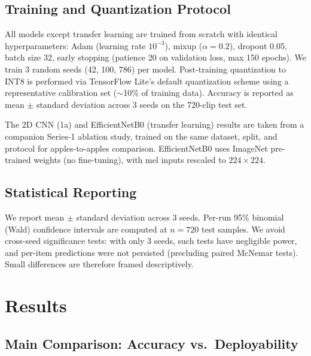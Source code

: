 \documentclass[conference]{IEEEtran}
\begin{document}
\subsection{Training and Quantization Protocol}

All models except transfer learning are trained from scratch with identical hyperparameters: Adam (learning rate $10^{-3}$), mixup ($\alpha=0.2$), dropout 0.05, batch size 32, early stopping (patience 20 on validation loss, max 150 epochs). We train 3 random seeds (42, 100, 786) per model. Post-training quantization to INT8 is performed via TensorFlow Lite's default quantization scheme using a representative calibration set ($\sim$10\% of training data). Accuracy is reported as mean $\pm$ standard deviation across 3 seeds on the 720-clip test set.

The 2D CNN (1a) and EfficientNetB0 (transfer learning) results are taken from a companion Series-1 ablation study, trained on the same dataset, split, and protocol for apples-to-apples comparison. EfficientNetB0 uses ImageNet pre-trained weights (no fine-tuning), with mel inputs rescaled to $224\times224$.

\subsection{Statistical Reporting}

We report mean $\pm$ standard deviation across 3 seeds. Per-run 95\% binomial (Wald) confidence intervals are computed at $n=720$ test samples. We avoid cross-seed significance tests: with only 3 seeds, such tests have negligible power, and per-item predictions were not persisted (precluding paired McNemar tests). Small differences are therefore framed descriptively.


\section{Results}

\subsection{Main Comparison: Accuracy vs.\ Deployability}
\end{document}
